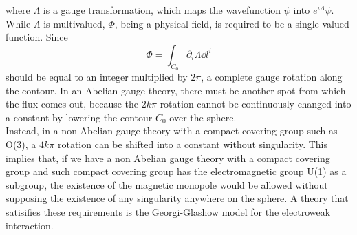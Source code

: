 \documentclass[main.tex]{subfiles}
\begin{document}
where $\Lambda$ is a gauge transformation, which maps the wavefunction $\psi$ into $e^{i\Lambda} \psi $. 
While $\Lambda$ is multivalued, $\Phi$, being a physical field, is required to be a single-valued function. Since
\begin{equation}
    \Phi = \int_{C_0} \partial_i \Lambda \dd{l}^i
\end{equation} 
should be equal to an integer multiplied by $2 \pi  $, a complete gauge rotation along the contour. 
In an Abelian gauge theory, there must be another spot from which the flux comes out, because the $2k \pi$ rotation cannot be continuously changed into a constant by lowering the contour $C_0$ over the sphere. \\ 
Instead, in a non Abelian gauge theory with a compact covering group such as O(3), a $4k\pi$ rotation can be shifted into a constant without singularity.
This implies that, if we have a non Abelian gauge theory with a compact covering group and such compact covering group has the electromagnetic group U(1) as a subgroup, the existence of the magnetic monopole would be allowed without supposing the existence of any singularity anywhere on the sphere.
A theory that satisifies these requirements is the Georgi-Glashow model for the electroweak interaction.
\end{document}
